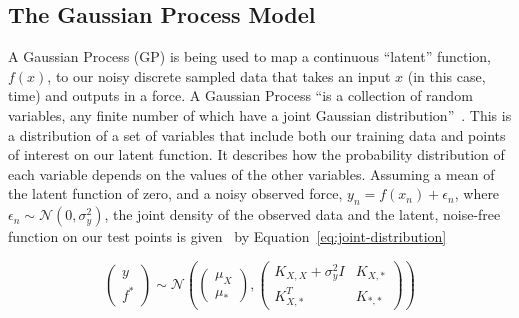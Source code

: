 \documentclass[12pt]{article}
\begin{document}
    \subsection{The Gaussian Process Model}
    A Gaussian Process (GP) is being used to map a continuous ``latent'' function, $f(x)$, to our noisy discrete sampled data that takes an input $x$ (in this case, time) and outputs in a force.
    A Gaussian Process ``is a collection of random variables, any finite number of which have a joint Gaussian distribution''~\cite{rasmussen2006gaussian}.
    This is a distribution of a set of variables that include both our training data and points of interest on our latent function.
    It describes how the probability distribution of each variable depends on the values of the other variables.
    Assuming a mean of the latent function of zero, and a noisy observed force, $y_n = f(x_n)+\epsilon_n$, where $\epsilon_n \sim \mathcal{N}(0, \sigma^2_y)$, the joint density of the observed data and the latent, noise-free function on our test points is given~\cite{murphy2023probabilistic} by Equation~\ref{eq:joint-distribution}

    \begin{equation}
        \begin{pmatrix}
            y \\
            f^*
        \end{pmatrix}
        \sim \mathcal{N} \left(
        \begin{pmatrix}
            \mu_X \\
            \mu_*
        \end{pmatrix},
        \begin{pmatrix}
            K_{X,X} + \sigma^2_y I & K_{X,*} \\
            K_{X,*}^T & K_{*,*}
        \end{pmatrix}
        \right)\label{eq:joint-distribution}
    \end{equation}

\end{document}
